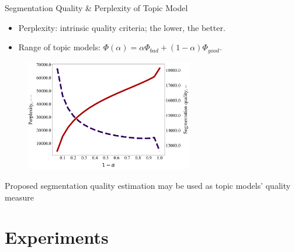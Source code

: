 \documentclass[russian]{beamer}
\begin{document}
\begin{frame}{Segmentation Quality \& Perplexity of Topic Model}
  \begin{itemize}\setlength{\itemindent}{-1em}
  \item Perplexity: intrinsic quality criteria; the lower, the better.
  \item Range of topic models: $\Phi(\alpha) = \alpha \Phi_{bad} + (1 - \alpha) \Phi_{good}$.
  \end{itemize}
  
  \begin{figure}[h]
    \centering
    \includegraphics[width=0.65\textwidth]{segm_quality-iteration200}
  \end{figure}
  
  \begin{block}{}
    Proposed segmentation quality estimation may be used as topic models’ quality measure
  \end{block}
\end{frame}


\section{Experiments}
\end{document}
